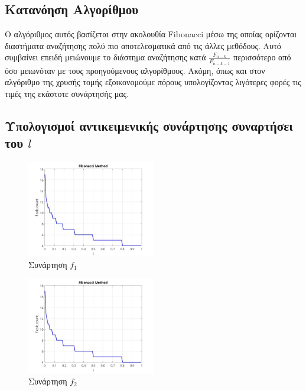 \subsection{Κατανόηση Αλγορίθμου}
Ο αλγόριθμος αυτός βασίζεται στην ακολουθία Fibonacci
μέσω της οποίας ορίζονται διαστήματα αναζήτησης πολύ πιο αποτελεσματικά από τις άλλες μεθόδους. Αυτό 
συμβαίνει επειδή μειώνουμε το διάστημα αναζήτησης κατά $\frac{F_{n-k}}{F_{n-k-1}}$ περισσότερο από όσο
μειωνόταν με τους προηγούμενους αλγορίθμους. Ακόμη, όπως και στον αλγόριθμο της χρυσής τομής εξοικονομούμε
πόρους υπολογίζοντας λιγότερες φορές τις τιμές της εκάστοτε συνάρτησής μας.

\subsection{Υπολογισμοί αντικειμενικής συνάρτησης συναρτήσει του $l$}
\begin{figure}[H] %
    \centering
    \includegraphics[width=0.5\textwidth]{media/fibonaccif1} %
    \caption{Συνάρτηση $f_1$}
\end{figure}

\begin{figure}[H] %
    \centering
    \includegraphics[width=0.5\textwidth]{media/fibonaccif2} %
    \caption{Συνάρτηση $f_2$}
\end{figure}

